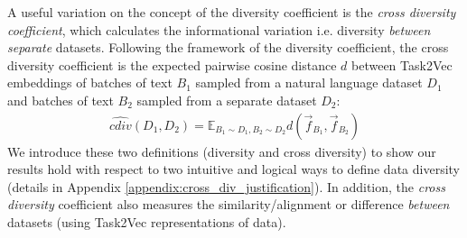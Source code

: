 \documentclass[10pt]{article} %
\begin{document}
A useful variation on the concept of the diversity coefficient is the \textit{cross diversity coefficient}, which calculates the informational variation i.e. diversity \textit{between} \textit{separate} datasets. 
Following the framework of the diversity coefficient, the cross diversity coefficient is the expected pairwise cosine distance $d$ between Task2Vec embeddings of batches of text $B_1$ sampled from a natural language dataset $D_1$ and batches of text $B_2$ sampled from a separate dataset $D_2$:
\begin{equation*}
\begin{aligned}
    \hat{cdiv}(D_1, D_2) =
    \mathbb{E}_{B_1 \sim D_1, B_2 \sim D_2} 
     d( \vec{f}_{B_1}, \vec{f}_{B_2} )
\end{aligned}
\end{equation*}
We introduce these two definitions (diversity and cross diversity) to show our results hold with respect to two intuitive and logical ways to define data diversity (details in Appendix \ref{appendix:cross_div_justification}).
In addition, the \textit{cross diversity} coefficient also measures the similarity/alignment or difference \textit{between} datasets (using Task2Vec representations of data).
\end{document}

